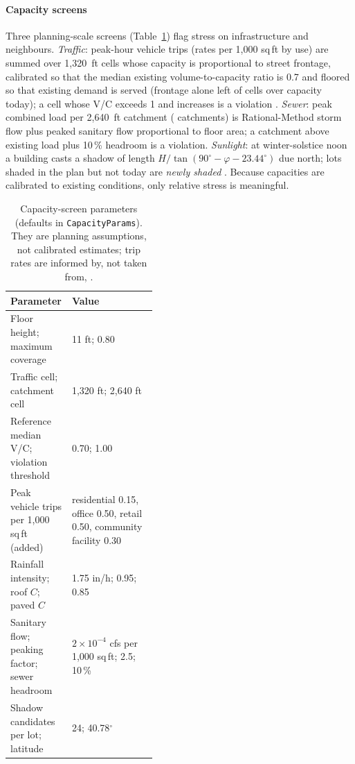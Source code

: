\documentclass[preprint,12pt]{elsarticle}
\begin{document}
\paragraph{Capacity screens} Three planning-scale screens (Table~\ref{tab:params}) flag stress on infrastructure and neighbours. \emph{Traffic}: peak-hour vehicle trips (rates per 1{,}000 sq\,ft by use) are summed over 1{,}320~ft cells whose capacity is proportional to street frontage, calibrated so that the median existing volume-to-capacity ratio is 0.7 and floored so that existing demand is served (frontage alone left \ExistingTazOverRaw{} of \NTaz{} cells over capacity today); a cell whose V/C exceeds 1 and increases is a violation \cite{bpr1964traffic}. \emph{Sewer}: peak combined load per 2{,}640~ft catchment (\NCatch{} catchments) is Rational-Method storm flow \cite{kuichling1889relation} plus peaked sanitary flow proportional to floor area; a catchment above existing load plus 10\,\% headroom is a violation. \emph{Sunlight}: at winter-solstice noon a building casts a shadow of length $H/\tan(90^\circ-\varphi-23.44^\circ)$ due north; lots shaded in the plan but not today are \emph{newly shaded} \cite{knowles2003solar}. Because capacities are calibrated to existing conditions, only relative stress is meaningful.

\begin{table}[t]
\centering\small
\caption{Capacity-screen parameters (defaults in \texttt{CapacityParams}). They are planning assumptions, not calibrated estimates; trip rates are informed by, not taken from, \cite{ite2021trip}.}
\label{tab:params}
\begin{tabularx}{\linewidth}{>{\raggedright\arraybackslash}p{0.42\linewidth}X}
\toprule
Parameter & Value \\
\midrule
Floor height; maximum coverage & 11 ft; 0.80 \\
Traffic cell; catchment cell & 1{,}320 ft; 2{,}640 ft \\
Reference median V/C; violation threshold & 0.70; 1.00 \\
Peak vehicle trips per 1{,}000 sq\,ft (added) & residential 0.15, office 0.50, retail 0.50, community facility 0.30 \\
Rainfall intensity; roof $C$; paved $C$ & 1.75 in/h; 0.95; 0.85 \\
Sanitary flow; peaking factor; sewer headroom & $2\times10^{-4}$ cfs per 1{,}000 sq\,ft; 2.5; 10\,\% \\
Shadow candidates per lot; latitude & 24; 40.78$^\circ$ \\
\bottomrule
\end{tabularx}
\end{table}
\end{document}

